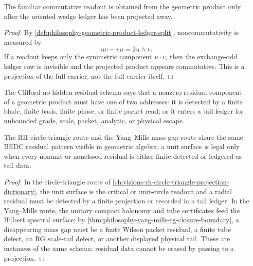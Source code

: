\begin{corollary}
\label{cor:philosophy-commutativity-ledger-forgetting-projection}
The familiar commutative readout is obtained from the geometric product
only after the oriented wedge ledger has been projected away.
\end{corollary}
\begin{proof}
By \autoref{def:philosophy-geometric-product-ledger-split},
noncommutativity is measured by
$$
uv-vu=2u\wedge v.
$$
If a readout keeps only the symmetric component $u\cdot v$, then the
exchange-odd ledger row is invisible and the projected product appears
commutative. This is a projection of the full carrier, not the full
carrier itself.
\end{proof}

\begin{definition}
\label{def:philosophy-clifford-no-hidden-residual-schema}
The Clifford no-hidden-residual schema says that a nonzero residual
component of a geometric product must have one of two addresses: it is
detected by a finite blade, finite basis, finite phase, or finite packet
read; or it enters a tail ledger for unbounded grade, scale, packet,
analytic, or physical escape.
\end{definition}

\begin{theorem}
\label{thm:philosophy-geometric-algebra-shared-residual-pattern}
The RH circle-triangle route and the Yang--Mills mass-gap route share
the same BEDC residual pattern visible in geometric algebra: a unit
surface is legal only when every nonunit or nonclosed residual is either
finite-detected or ledgered as tail data.
\end{theorem}
\begin{proof}
In the circle-triangle route of
\autoref{ch:visions-rh-circle-triangle-projection-dictionary}, the unit
surface is the critical or unit-circle readout and a radial residual must
be detected by a finite projection or recorded in a tail ledger. In the
Yang--Mills route, the unitary compact holonomy and tube certificates
feed the Hilbert spectral surface; by
\autoref{thm:philosophy-yang-mills-rg-closure-boundary}, a disappearing
mass gap must be a finite Wilson packet residual, a finite tube defect,
an RG scale-tail defect, or another displayed physical tail. These are
instances of the same schema: residual data cannot be erased by passing
to a projection.
\end{proof}

